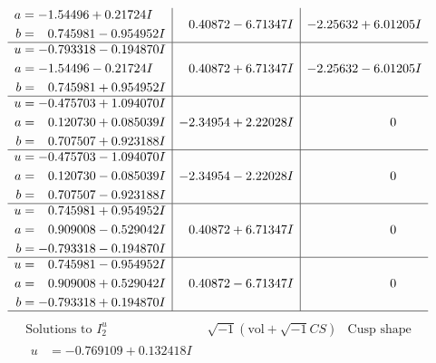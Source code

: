 \documentclass[1p]{elsarticle_modified}
\theoremstyle{definition}
\newcommand{\I}{\sqrt{-1}}
\begin{document}
$$\begin{array}{c|c|c}
\begin{aligned}
a &= -1.54496 + 0.21724 I \\
b &= \phantom{-}0.745981 - 0.954952 I\end{aligned}
 & \phantom{-}0.40872 - 6.71347 I & -2.25632 + 6.01205 I \\ \hline\begin{aligned}
u &= -0.793318 - 0.194870 I \\
a &= -1.54496 - 0.21724 I \\
b &= \phantom{-}0.745981 + 0.954952 I\end{aligned}
 & \phantom{-}0.40872 + 6.71347 I & -2.25632 - 6.01205 I \\ \hline\begin{aligned}
u &= -0.475703 + 1.094070 I \\
a &= \phantom{-}0.120730 + 0.085039 I \\
b &= \phantom{-}0.707507 + 0.923188 I\end{aligned}
 & -2.34954 + 2.22028 I & \phantom{-0.000000 } 0 \\ \hline\begin{aligned}
u &= -0.475703 - 1.094070 I \\
a &= \phantom{-}0.120730 - 0.085039 I \\
b &= \phantom{-}0.707507 - 0.923188 I\end{aligned}
 & -2.34954 - 2.22028 I & \phantom{-0.000000 } 0 \\ \hline\begin{aligned}
u &= \phantom{-}0.745981 + 0.954952 I \\
a &= \phantom{-}0.909008 - 0.529042 I \\
b &= -0.793318 - 0.194870 I\end{aligned}
 & \phantom{-}0.40872 + 6.71347 I & \phantom{-0.000000 } 0 \\ \hline\begin{aligned}
u &= \phantom{-}0.745981 - 0.954952 I \\
a &= \phantom{-}0.909008 + 0.529042 I \\
b &= -0.793318 + 0.194870 I\end{aligned}
 & \phantom{-}0.40872 - 6.71347 I & \phantom{-0.000000 } 0\\
 \hline 
 \end{array}$$\newpage$$\begin{array}{c|c|c}  
\text{Solutions to }I^u_{2}& \I (\text{vol} + \sqrt{-1}CS) & \text{Cusp shape}\\
 \hline 
\begin{aligned}
u &= -0.769109 + 0.132418 I \\

\end{aligned}
\end{array}$$
\end{document}
